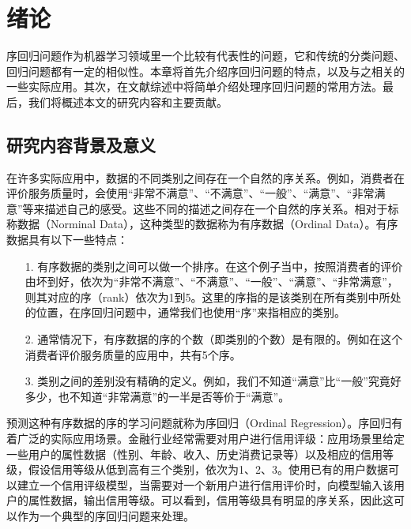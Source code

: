 
\chapter{绪论}
\label{chap:introduction}

序回归问题作为机器学习领域里一个比较有代表性的问题，它和传统的分类问题、回归问题都有一定的相似性。本章将首先介绍序回归问题的特点，以及与之相关的一些实际应用。其次，在文献综述中将简单介绍处理序回归问题的常用方法。最后，我们将概述本文的研究内容和主要贡献。

\section{研究内容背景及意义}
\label{intro_back}
在许多实际应用中，数据的不同类别之间存在一个自然的序关系。例如，消费者在评价服务质量时，会使用“非常不满意”、“不满意”、“一般”、“满意”、“非常满意”等来描述自己的感受。这些不同的描述之间存在一个自然的序关系。相对于标称数据（Norminal Data），这种类型的数据称为有序数据（Ordinal Data）。有序数据具有以下一些特点：
\begin{enumerate}
\item[1.] 有序数据的类别之间可以做一个排序。在这个例子当中，按照消费者的评价由坏到好，依次为“非常不满意”、“不满意”、“一般”、“满意”、“非常满意”，则其对应的序（rank）依次为1到5。这里的序指的是该类别在所有类别中所处的位置，在序回归问题中，通常我们也使用“序”来指相应的类别。
\item[2.] 通常情况下，有序数据的序的个数（即类别的个数）是有限的。例如在这个消费者评价服务质量的应用中，共有5个序。
\item[3.] 类别之间的差别没有精确的定义。例如，我们不知道“满意”比“一般”究竟好多少，也不知道“非常满意”的一半是否等价于“满意”。
\end{enumerate}
预测这种有序数据的序的学习问题就称为序回归（Ordinal Regression）。序回归有着广泛的实际应用场景。金融行业经常需要对用户进行信用评级：应用场景里给定一些用户的属性数据（性别、年龄、收入、历史消费记录等）以及相应的信用等级，假设信用等级从低到高有三个类别，依次为1、2、3。使用已有的用户数据可以建立一个信用评级模型，当需要对一个新用户进行信用评价时，向模型输入该用户的属性数据，输出信用等级。可以看到，信用等级具有明显的序关系，因此这可以作为一个典型的序回归问题来处理\citep{kwon1997ordinal}\citep{kim2012corporate}\citep{dikkers2005support}\citep{fernandez2013addressing}。
